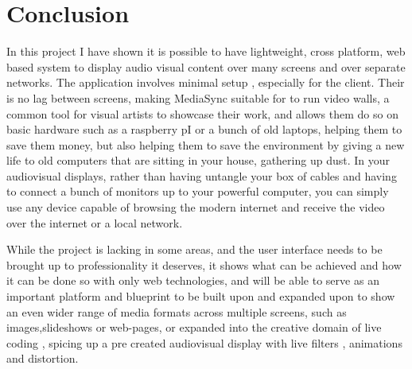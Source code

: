 \documentclass{article}
\begin{document}
\section{Conclusion}
In this project I have shown it is possible to have lightweight, cross platform, web based system to display audio visual content over many screens and over separate networks. The application involves minimal setup , especially for the client. Their is no lag between screens, making MediaSync suitable for to run video walls, a common tool for visual artists to showcase their work, and allows them do so on basic hardware such as a raspberry pI or a bunch of old laptops, helping them to save them money, but also helping them to save the environment by giving a new life to old computers that are sitting in your house, gathering up dust. In your audiovisual displays, rather than having untangle your box of cables and having to connect a bunch of monitors up to your powerful computer, you can simply use any device capable of browsing the modern internet and receive the video over the internet or a local network. 

While the project is lacking in some areas, and the user interface needs to be brought up to professionality it deserves, it shows what can be achieved and how it can be done so with only web technologies, and will be able to serve as an important platform and blueprint to be built upon and expanded upon to show an even wider range of media formats across multiple screens, such as images,slideshows or web-pages, or expanded into the creative domain of live coding , spicing up a pre created audiovisual display with live filters , animations and distortion.
 

\printbibliography[
heading=bibintoc,
title={Bibliography}
]
\end{document}
